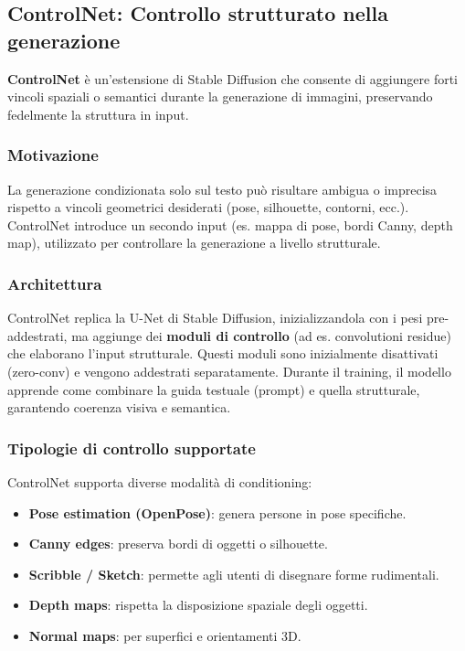 \subsection*{ControlNet: Controllo strutturato nella generazione}

\textbf{ControlNet} è un'estensione di Stable Diffusion che consente di aggiungere forti vincoli spaziali o semantici durante la generazione di immagini, preservando fedelmente la struttura in input.

\subsubsection*{Motivazione}

La generazione condizionata solo sul testo può risultare ambigua o imprecisa rispetto a vincoli geometrici desiderati (pose, silhouette, contorni, ecc.). ControlNet introduce un secondo input (es. mappa di pose, bordi Canny, depth map), utilizzato per controllare la generazione a livello strutturale.

\subsubsection*{Architettura}

ControlNet replica la U-Net di Stable Diffusion, inizializzandola con i pesi pre-addestrati, ma aggiunge dei \textbf{moduli di controllo} (ad es. convolutioni residue) che elaborano l’input strutturale. Questi moduli sono inizialmente disattivati (zero-conv) e vengono addestrati separatamente. Durante il training, il modello apprende come combinare la guida testuale (prompt) e quella strutturale, garantendo coerenza visiva e semantica.

\subsubsection*{Tipologie di controllo supportate}

ControlNet supporta diverse modalità di conditioning:

\begin{itemize}
    \item \textbf{Pose estimation (OpenPose)}: genera persone in pose specifiche.
    \item \textbf{Canny edges}: preserva bordi di oggetti o silhouette.
    \item \textbf{Scribble / Sketch}: permette agli utenti di disegnare forme rudimentali.
    \item \textbf{Depth maps}: rispetta la disposizione spaziale degli oggetti.
    \item \textbf{Normal maps}: per superfici e orientamenti 3D.
\end{itemize}

